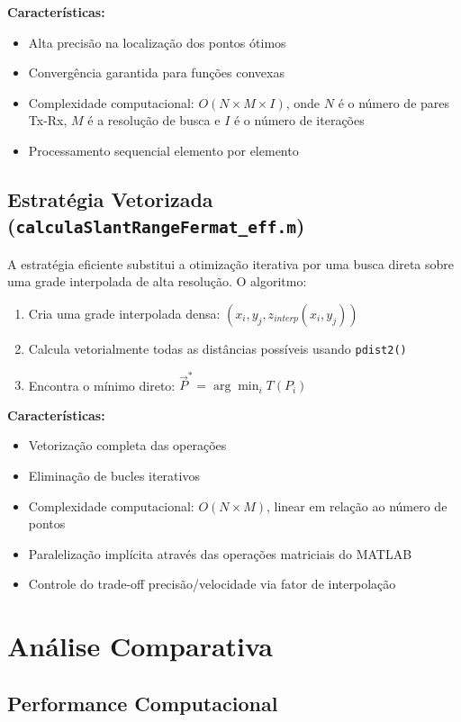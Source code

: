 \documentclass[11pt,a4paper]{article}
\begin{document}
\textbf{Características:}
\begin{itemize}
\item Alta precisão na localização dos pontos ótimos
\item Convergência garantida para funções convexas
\item Complexidade computacional: $O(N \times M \times I)$, onde $N$ é o número de pares Tx-Rx, $M$ é a resolução de busca e $I$ é o número de iterações
\item Processamento sequencial elemento por elemento
\end{itemize}

\subsection{Estratégia Vetorizada (\texttt{calculaSlantRangeFermat\_eff.m})}

A estratégia eficiente substitui a otimização iterativa por uma busca direta sobre uma grade interpolada de alta resolução. O algoritmo:

\begin{enumerate}
\item Cria uma grade interpolada densa: $(x_i, y_j, z_{interp}(x_i, y_j))$
\item Calcula vetorialmente todas as distâncias possíveis usando \texttt{pdist2()}
\item Encontra o mínimo direto: $\vec{P}^* = \arg\min_i T(P_i)$
\end{enumerate}

\textbf{Características:}
\begin{itemize}
\item Vetorização completa das operações
\item Eliminação de bucles iterativos
\item Complexidade computacional: $O(N \times M)$, linear em relação ao número de pontos
\item Paralelização implícita através das operações matriciais do MATLAB
\item Controle do trade-off precisão/velocidade via fator de interpolação
\end{itemize}

\section{Análise Comparativa}

\subsection{Performance Computacional}
\end{document}
